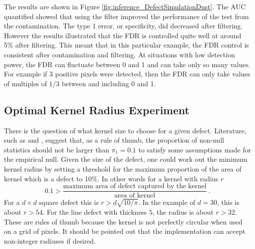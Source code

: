 The results are shown in Figure \ref{fig:inference_DefectSimulationDust}. The AUC quantified showed that using the filter improved the performance of the test from the contamination. The type 1 error, or specificity, did decreased after filtering. However the results illustrated that the FDR is controlled quite well at around 5\% after filtering. This meant that in this particular example, the FDR control is consistent after contamination and filtering. At situations with low detection power, the FDR can fluctuate between 0 and 1 and can take only so many values. For example if 3 positive pixels were detected, then the FDR can only take values of multiples of $1/3$ between and including 0 and 1.

\subsection{Optimal Kernel Radius Experiment}

There is the question of what kernel size to choose for a given defect. Literature, such as \cite{efron2004large} and \cite{schwartzman2008empirical}, suggest that, as a rule of thumb, the proportion of non-null statistics should not be larger than $\pi_1=0.1$ to satisfy some assumptions made for the empirical null. Given the size of the defect, one could work out the minimum kernel radius by setting a threshold for the maximum proportion of the area of kernel which is a defect to 10\%. In other words for a kernel with radius $r$
\begin{equation}
0.1 > \dfrac{\text{maximum area of defect captured by the kernel}}{\text{area of kernel}} \ .
\end{equation}
For a $d \times d$ square defect this is $r > d \sqrt{10/\pi}$.
In the example of $d=30$, this is about $r>54$. For the line defect with thickness $5$, the radius is about $r>32$. These are rules of thumb because the kernel is not perfectly circular when used on a grid of pixels. It should be pointed out that the implementation can accept non-integer radiuses if desired.

